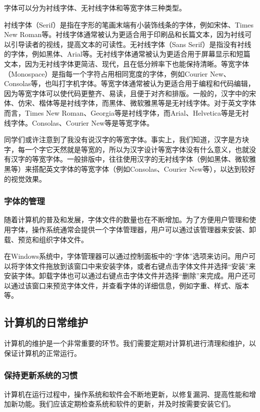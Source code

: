 字体可以分为衬线字体、无衬线字体和等宽字体三种类型。

衬线字体（Serif）是指在字形的笔画末端有小装饰线条的字体，例如宋体、Times New Roman等。衬线字体通常被认为更适合用于印刷品和长篇文本，因为衬线可以引导读者的视线，提高文本的可读性。无衬线字体（Sans Serif）是指没有衬线的字体，例如黑体、Arial等。无衬线字体通常被认为更适合用于屏幕显示和短篇文本，因为无衬线字体更简洁、现代，且在低分辨率下也能保持清晰。等宽字体（Monospace）是指每一个字符占用相同宽度的字体，例如Courier New、Consolas等，也叫打字机字体。等宽字体通常被认为更适合用于编程和代码编辑，因为等宽字体可以使代码更整齐、易读，且便于对齐和排版。一般的，汉字中的宋体、仿宋、楷体等是衬线字体，而黑体、微软雅黑等是无衬线字体。对于英文字体而言，Times New Roman、Georgia等是衬线字体，而Arial、Helvetica等是无衬线字体。Consolas、Courier New等是等宽字体。

同学们或许注意到了我没有说汉字的等宽字体。事实上，我们知道，汉字是方块字，每一个字它天然就是等宽的，所以为汉字设计等宽字体没有什么意义，也就没有汉字的等宽字体。一般排版中，往往使用汉字的无衬线字体（例如黑体、微软雅黑等）来搭配英文字体的等宽字体（例如Consolas、Courier New等），以达到较好的视觉效果。

\subsubsection{字体的管理}

随着计算机的普及和发展，字体文件的数量也在不断增加。为了方便用户管理和使用字体，操作系统通常会提供一个字体管理器，用户可以通过该管理器来安装、卸载、预览和组织字体文件。

在Windows系统中，字体管理器可以通过控制面板中的“字体”选项来访问。用户可以将字体文件拖放到该窗口中来安装字体，或者右键点击字体文件并选择“安装”来安装字体。卸载字体也可以通过右键点击字体文件并选择“删除”来完成。用户还可以通过该窗口来预览字体文件，并查看字体的详细信息，例如字重、样式、版本等。

\subsection{计算机的日常维护}

计算机的维护是一个非常重要的环节。我们需要定期对计算机进行清理和维护，以保证计算机的正常运行。

\subsubsection{保持更新系统的习惯}

计算机在运行过程中，操作系统和软件会不断地更新，以修复漏洞、提高性能和增加新功能。我们应该定期检查系统和软件的更新，并及时按需要安装它们。

